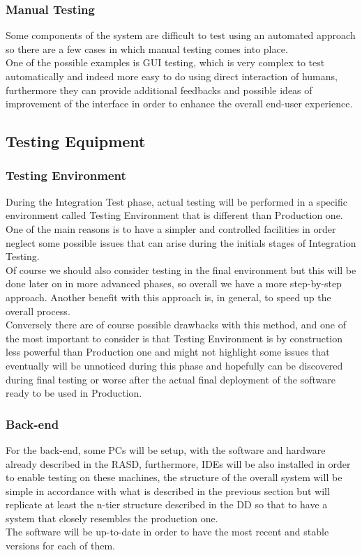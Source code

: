\subsubsection{Manual Testing}
Some components of the system are difficult to test using an automated approach so there are a few cases in which manual testing comes into place. \\ One of the possible examples is GUI testing, which is very complex to test automatically and indeed more easy to do using direct interaction of humans, furthermore they can provide additional feedbacks and possible ideas of improvement of the interface in order to enhance the overall end-user experience. 

\subsection{Testing Equipment}

\subsubsection{Testing Environment}
During the Integration Test phase, actual testing will be performed in a specific environment called Testing Environment that is different than Production one. One of the main reasons is to have a simpler and controlled facilities in order neglect some possible issues that can arise during the initials stages of Integration Testing. \\ Of course we should also consider testing in the final environment but this will be done later on in more advanced phases, so overall we have a more step-by-step approach. Another benefit with this approach is, in general, to speed up the overall process. \\ Conversely there are of course possible drawbacks with this method, and one of the most important to consider is that Testing Environment is by construction less powerful than Production one and might not highlight some issues that eventually will be unnoticed during this phase and hopefully can be discovered during final testing or worse after the actual final deployment of the software ready to be used in Production.  

\subsubsection{Back-end}
For the back-end, some PCs will be setup, with the software and hardware already described in the RASD, furthermore, IDEs will be also installed in order to enable testing on these machines, the structure of the overall system will be simple in accordance with what is described in the previous section but will replicate at least the n-tier structure described in the DD so that to have a system that closely resembles the production one. \\ The software will be up-to-date in order to have the most recent and stable versions for each of them.

